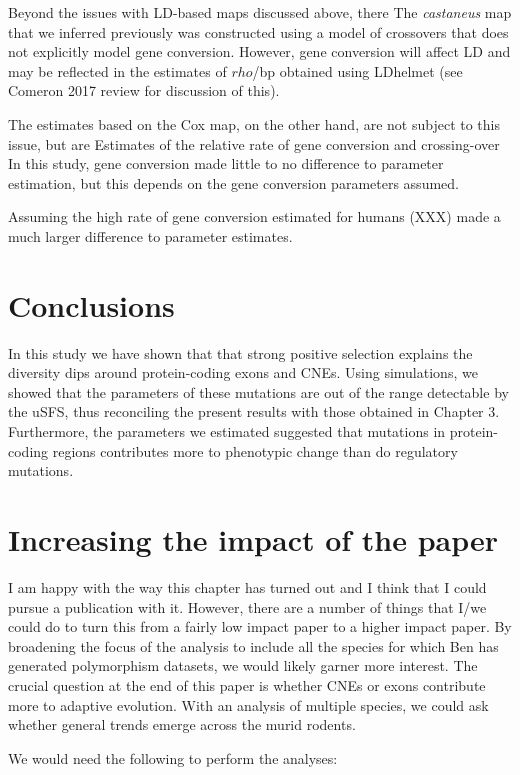 \documentclass[11pt]{article}
\begin{document}
	Beyond the issues with LD-based maps discussed above, there 
	The \textit{castaneus} map that we inferred previously \citep{RN340} was constructed using a model of crossovers that does not explicitly model gene conversion. However, gene conversion will affect LD and may be reflected in the estimates of $rho$/bp  obtained using LDhelmet (see Comeron 2017 review for discussion of this).
	
	The estimates based on the Cox map, on the other hand, are not subject to this issue, but are 
	Estimates of the relative rate of gene conversion and crossing-over 
		In this study, gene conversion made little to no difference to parameter estimation, but this depends on the gene conversion parameters assumed. 

Assuming the high rate of gene conversion estimated for humans (XXX) made a much larger difference to parameter estimates.

\section*{Conclusions}

	In this study we have shown that that strong positive selection explains the diversity dips around protein-coding exons and CNEs. Using simulations, we showed that the parameters of these mutations are out of the range detectable by the uSFS, thus reconciling the present results with those obtained in Chapter 3. Furthermore, the parameters we estimated suggested that mutations in protein-coding regions contributes more to phenotypic change than do regulatory mutations.

\section*{Increasing the impact of the paper}

	I am happy with the way this chapter has turned out and I think that I could pursue a publication with it. However, there are a number of things that I/we could do to turn this from a fairly low impact paper to a higher impact paper. By broadening the focus of the analysis to include all the species for which Ben has generated polymorphism datasets, we would likely garner more interest. The crucial question at the end of this paper is whether CNEs or exons contribute more to adaptive evolution. With an analysis of multiple species, we could ask whether general trends emerge across the murid rodents.

	We would need the following to perform the analyses:
	
\end{document}
